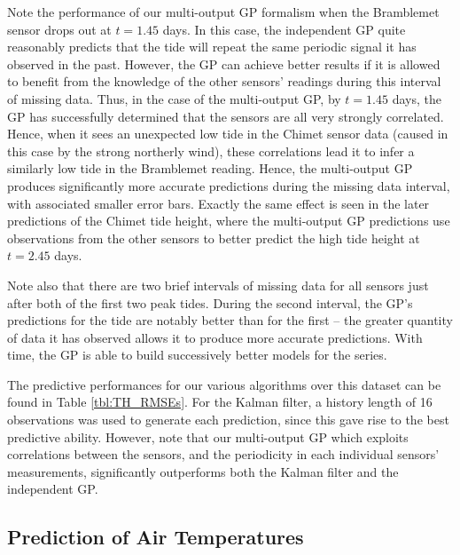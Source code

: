 \documentclass{acmsmall}
\begin{document}
Note the performance of our multi-output GP formalism when the Bramblemet sensor drops out at $t=1.45$ days.
In this case, the independent GP quite reasonably predicts that the tide will repeat the same periodic signal it has observed in the past. However, the GP can achieve better results if it is allowed to benefit from the knowledge of the other sensors' readings during this interval of missing data. Thus, in the case of the multi-output GP, by $t=1.45$ days, the GP has successfully determined that the sensors are all very strongly correlated. Hence, when it sees an unexpected low tide in the Chimet sensor data (caused in this case by the strong northerly wind), these correlations lead it to infer a similarly low tide in the Bramblemet reading. Hence, the multi-output GP produces significantly more accurate predictions during the missing data interval, with associated smaller error bars. Exactly the same effect is seen in the later predictions of the Chimet tide height, where the multi-output GP predictions use observations from the other sensors to better predict the high tide height at $t=2.45$ days. 

Note also that there are two brief intervals of missing data for all sensors just after both of the first two peak tides. During the second interval, the GP's predictions for the tide are notably better than for the first -- the greater quantity of data it has observed allows it to produce more accurate predictions. With time, the GP is able to build successively better models for the series.

The predictive performances for our various algorithms over this dataset can be found in Table \ref{tbl:TH_RMSEs}. For the Kalman filter, a history length of 16 observations was used to generate each prediction, since this gave rise to the best predictive ability. However, note that our multi-output GP which exploits correlations between the sensors, and the periodicity in each individual sensors' measurements, significantly outperforms both the Kalman filter and the independent GP.


\subsection{Prediction of Air Temperatures}
\end{document}

